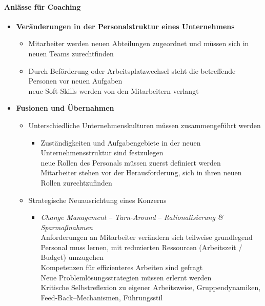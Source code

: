 \documentclass[11pt,a4paper]{article}
\begin{document}
\paragraph{\textsf{Anlässe für Coaching}}
\begin{itemize}
\item \textbf{Veränderungen in der Personalstruktur eines Unternehmens}

	\begin{itemize}
	\item Mitarbeiter werden neuen Abteilungen zugeordnet und müssen sich in neuen Teams zurechtfinden
	\item Durch Beförderung oder Arbeitsplatzwechsel steht die betreffende Personen vor neuen Aufgaben\\
	 neue Soft-Skills werden von den Mitarbeitern verlangt
	\end{itemize}

\item \textbf{Fusionen und Übernahmen}

	\begin{itemize}
	\item Unterschiedliche Unternehmenskulturen müssen zusammengeführt werden

		\begin{itemize}
		\item[\textbullet] Zuständigkeiten und Aufgabengebiete in der neuen Unternehmensstruktur sind festzulegen\\
		 neue Rollen des Personals müssen zuerst definiert werden\\
		 Mitarbeiter stehen vor der Herausforderung, sich in ihren neuen Rollen zurechtzufinden
		\end{itemize}

	\item Strategische Neuausrichtung eines Konzerns

		\begin{itemize}
		\item[\textbullet] \textsl{Change Management} -- \textsl{Turn-Around} -- \textsl{Rationalisierung \& Sparmaßnahmen}\\
		 Anforderungen an Mitarbeiter verändern sich teilweise grundlegend\\
		 Personal muss lernen, mit reduzierten Ressourcen (Arbeitszeit / Budget) umzugehen\\
		 Kompetenzen für effizienteres Arbeiten sind gefragt\\
		 Neue Problemlösungsstrategien müssen erlernt werden\\
		 Kritische Selbstreflexion zu eigener Arbeitsweise, Gruppendynamiken, Feed-Back--Mechanismen, Führungsstil
		\end{itemize}


	\end{itemize}
\end{itemize}
\end{document}
